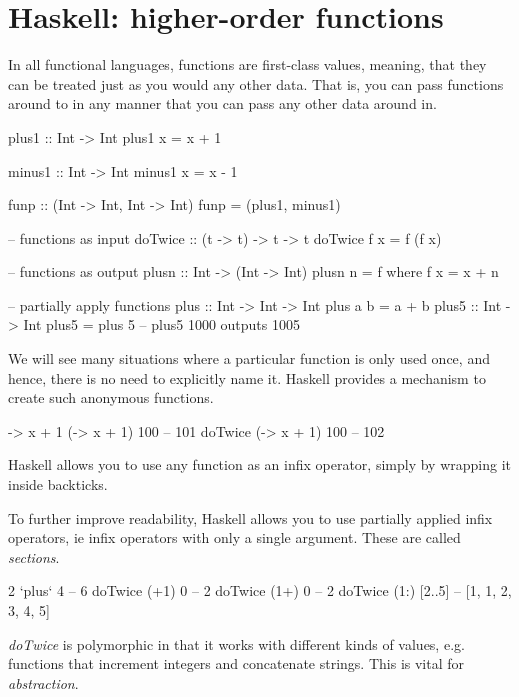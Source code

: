 \section{Haskell: higher-order functions}
In all functional languages, functions are first-class values, meaning, that they can be treated just as you would any other data. That is, you can pass functions around to in any manner that you can pass any other data around in.

\begin{haskellcode}
plus1 :: Int -> Int
plus1 x = x + 1

minus1 :: Int -> Int
minus1 x = x - 1

funp :: (Int -> Int, Int -> Int)
funp = (plus1, minus1)
\end{haskellcode}

\begin{haskellcode}
-- functions as input
doTwice :: (t -> t) -> t -> t
doTwice f x = f (f x)

-- functions as output
plusn :: Int -> (Int -> Int)
plusn n = f
          where f x = x + n

-- partially apply functions
plus :: Int -> Int -> Int
plus a b = a + b
plus5 :: Int -> Int
plus5 = plus 5 -- plus5 1000 outputs 1005
\end{haskellcode}

We will see many situations where a particular function is only used once, and hence, 
there is no need to explicitly name it. Haskell provides a mechanism to create such anonymous functions.

\begin{haskellcode}
\x -> x + 1
(\x -> x + 1) 100 -- 101
doTwice (\x -> x + 1) 100 -- 102
\end{haskellcode}

Haskell allows you to use any function as an infix operator,
simply by wrapping it inside backticks.

To further improve readability, Haskell allows you to use partially applied infix operators, ie infix operators with only a single argument. These are called \textit{sections}.
\begin{haskellcode}
2 `plus` 4 -- 6
doTwice (+1) 0 -- 2
doTwice (1+) 0 -- 2
doTwice (1:) [2..5] -- [1, 1, 2, 3, 4, 5]
\end{haskellcode}

\textit{doTwice} is polymorphic in that it works with different kinds of values, 
e.g. functions that increment integers and concatenate strings. This is vital for \textit{abstraction}.

